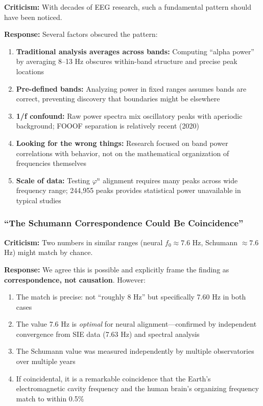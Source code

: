 \documentclass[11pt,a4paper]{article}
\newcommand{\phisym}{\varphi}
\newcommand{\fzero}{f_0}
\begin{document}
\textbf{Criticism:} With decades of EEG research, such a fundamental pattern should have been noticed.

\textbf{Response:} Several factors obscured the pattern:

\begin{enumerate}
    \item \textbf{Traditional analysis averages across bands:} Computing ``alpha power'' by averaging 8--13 Hz obscures within-band structure and precise peak locations
    
    \item \textbf{Pre-defined bands:} Analyzing power in fixed ranges assumes bands are correct, preventing discovery that boundaries might be elsewhere
    
    \item \textbf{1/f confound:} Raw power spectra mix oscillatory peaks with aperiodic background; FOOOF separation is relatively recent (2020)
    
    \item \textbf{Looking for the wrong things:} Research focused on band power correlations with behavior, not on the mathematical organization of frequencies themselves
    
    \item \textbf{Scale of data:} Testing $\phisym^n$ alignment requires many peaks across wide frequency range; 244,955 peaks provides statistical power unavailable in typical studies
\end{enumerate}

\subsubsection{``The Schumann Correspondence Could Be Coincidence''}

\textbf{Criticism:} Two numbers in similar ranges (neural $\fzero \approx 7.6$ Hz, Schumann $\approx 7.6$ Hz) might match by chance.

\textbf{Response:} We agree this is possible and explicitly frame the finding as \textbf{correspondence, not causation}. However:

\begin{enumerate}
    \item The match is precise: not ``roughly 8 Hz'' but specifically 7.60 Hz in both cases
    
    \item The value 7.6 Hz is \textit{optimal} for neural alignment---confirmed by independent convergence from SIE data (7.63 Hz) and spectral analysis
    
    \item The Schumann value was measured independently by multiple observatories over multiple years
    
    \item If coincidental, it is a remarkable coincidence that the Earth's electromagnetic cavity frequency and the human brain's organizing frequency match to within 0.5\%
\end{enumerate}
\end{document}
